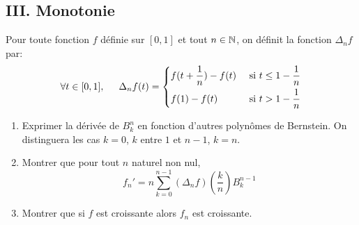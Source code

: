 \subsection*{III. Monotonie}
Pour toute fonction $f$ définie sur $[0,1]$ et tout $n\in \mathbb{N}$, on définit la fonction $\Delta_nf$ par:
\begin{displaymath}
 \forall t \in [0,1],\hspace{0.5cm} \Delta_nf(t)=
\left\lbrace 
\begin{aligned}
 &f(t+\frac{1}{n})-f(t) &\text{ si } t\leq 1 - \frac{1}{n}\\
 &f(1)-f(t)&\text{ si } t> 1 - \frac{1}{n}
\end{aligned}
\right. 
\end{displaymath}
\begin{enumerate}
\item Exprimer la dérivée de $B^n_k$ en fonction d'autres polynômes de Bernstein. On distinguera les cas $k=0$, $k$ entre $1$ et $n-1$, $k=n$.

\item Montrer que pour tout $n$ naturel non nul,
\begin{displaymath}
 f_n' = n\sum_{k=0}^{n-1} (\Delta_nf)(\frac{k}{n})B^{n-1}_k
\end{displaymath}

\item Montrer que si $f$ est croissante alors $f_n$ est croissante. 
\end{enumerate}

